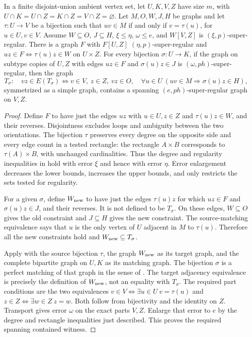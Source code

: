 \begin{lemma}
In a finite disjoint-union ambient vertex set, let $U,K,V,Z$ have size
$m$, with $U\cap K=U\cap Z=K\cap Z=V\cap Z=\varnothing$.
Let $M,O,W,J,H$ be graphs and let $\tau:U\to V$ be a bijection such that
$uv\in M$ if and only if $v=\tau(u)$, for $u\in U,v\in V$.
Assume $W\subseteq O$, $J\subseteq H$, $\xi\le\eta$, $\omega\le e$,
and $W[V,Z]$ is $(\xi,p)$-super-regular.
There is a graph $F$ with $F[U,Z]$ $(\eta,p)$-super-regular and
$uz\in F\Longleftrightarrow\tau(u)z\in W$ on $U\times Z$.
For every bijection $\sigma:U\to K$, if the graph on subtype copies of
$U,Z$ with edges $uz\in F$ and $\sigma(u)z\in J$ is
$(\omega,ph)$-super-regular, then the graph
\[
 T_\sigma:\quad vz\in E(T_\sigma)\Longleftrightarrow
 v\in V,\ z\in Z,\ vz\in O,\quad
 \forall u\in U\ (uv\in M\Rightarrow\sigma(u)z\in H),
\]
symmetrized as a simple graph, contains a spanning
$(e,ph)$-super-regular graph on $V,Z$.
\end{lemma}
\begin{proof}
Define $F$ to have just the edges $uz$ with $u\in U,z\in Z$ and
$\tau(u)z\in W$, and their reverses. Disjointness excludes loops and
ambiguity between the two orientations. The bijection $\tau$ preserves
every degree on the opposite side and every edge count in a tested
rectangle: the rectangle $A\times B$ corresponds to
$\tau(A)\times B$, with unchanged cardinalities. Thus the degree and
regularity inequalities in  hold with error
$\xi$ and hence with error $\eta$. Error enlargement decreases the lower
bounds, increases the upper bounds, and only restricts the sets tested for
regularity.

For a given $\sigma$, define $W_{\rm new}$ to have just the edges
$\tau(u)z$ for which $uz\in F$ and $\sigma(u)z\in J$, and their
reverses. It is not defined to be $T_\sigma$. On these edges, $W\subseteq O$
gives the old constraint and $J\subseteq H$ gives the new constraint.
The source-matching equivalence says that $u$ is the only vertex of $U$
adjacent in $M$ to $\tau(u)$. Therefore all the new constraints hold and
$W_{\rm new}\subseteq T_\sigma$.

Apply  with the
source bijection $\tau$, the graph $W_{\rm new}$ as its target graph,
and the complete bipartite graph on $U,K$ as its matching graph. The
bijection $\sigma$ is a perfect matching of that graph in the sense of
. The target adjacency equivalence is precisely
the definition of $W_{\rm new}$, not an equality with $T_\sigma$.
The required part conditions are the two equivalences
$v\in V\Longleftrightarrow\exists u\in U\ v=\tau(u)$ and
$z\in Z\Longleftrightarrow\exists w\in Z\ z=w$.
Both follow from bijectivity and the identity on $Z$.
Transport gives error $\omega$ on the exact parts $V,Z$. Enlarge that
error to $e$ by the degree and rectangle inequalities just described.
This proves the required spanning contained witness.
\end{proof}
